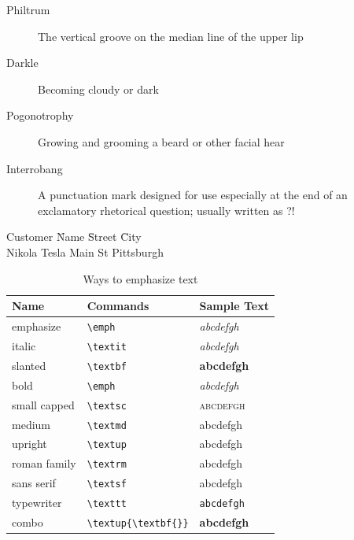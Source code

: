 \documentclass[a4paper,12pt]{book}
\begin{document}
\begin{description}
    \item[Philtrum] The vertical groove on the median line of the upper lip
    \item[Darkle] Becoming cloudy or dark
    \item[Pogonotrophy] Growing and grooming a beard or other facial hear
    \item[Interrobang] A punctuation mark designed for use especially at the end of an exclamatory rhetorical question; usually written as ?!
\end{description}

\begin{tabbing}
    Customer \= Name \hspace*{1.5cm}\= Street \hspace*{1.5cm} \= City \\
    \> Nikola Tesla  Main St \> Pittsburgh \\
\end{tabbing}

\begin{table}
\begin{tabular}{l|l|l}
    \textbf{Name} & \textbf{Commands} & \textbf{Sample Text} \\
    \hline
    emphasize & \verb|\emph| & \emph{abcdefgh} \\
    italic & \verb|\textit| & \textit{abcdefgh} \\
    slanted & \verb|\textbf| & \textbf{abcdefgh} \\
    bold & \verb|\emph| & \emph{abcdefgh} \\
    small capped & \verb|\textsc| & \textsc{abcdefgh} \\
    medium & \verb|\textmd| & \textmd{abcdefgh} \\
    upright & \verb|\textup| & \textup{abcdefgh} \\
    roman family & \verb|\textrm| & \textrm{abcdefgh} \\
    sans serif & \verb|\textsf| & \textsf{abcdefgh} \\
    typewriter & \verb|\texttt| & \texttt{abcdefgh} \\
    combo & \verb|\textup{\textbf{}}| & \textup{\textbf{abcdefgh}} \\
\end{tabular}
\caption{Ways to emphasize text}\label{sec:typeemp}
\end{table}
\end{document}

